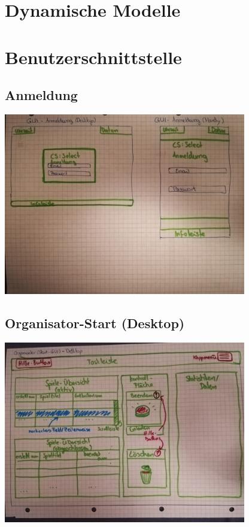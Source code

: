 \documentclass[a4paper]{scrreprt}
\begin{document}
    \section{Dynamische Modelle}

    \section{Benutzerschnittstelle}

    \subsection{Anmeldung}
    \centering
    \includegraphics[width=400px]{../pictures/1_Anmeldung.jpg}

    \subsection{Organisator-Start (Desktop)}
    \centering
    \includegraphics[width=400px]{../pictures/2_Organisator.jpg}
\end{document}

